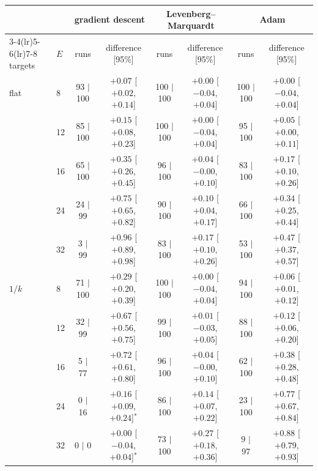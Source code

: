 \begin{tabular}{llcccccc}\toprule
 & & \multicolumn{2}{c}{gradient descent} & \multicolumn{2}{c}{Levenberg--Marquardt} & \multicolumn{2}{c}{Adam} \\\cmidrule(lr){3-4}\cmidrule(lr){5-6}\cmidrule(lr){7-8}
targets & $E$ & runs & difference [95\%] & runs & difference [95\%] & runs & difference [95\%] \\\midrule
flat & 8 & 93 $|$ 100 & $+0.07$ [$+0.02$, $+0.14$] & 100 $|$ 100 & $+0.00$ [$-0.04$, $+0.04$] & 100 $|$ 100 & $+0.00$ [$-0.04$, $+0.04$] \\
 & 12 & 85 $|$ 100 & $+0.15$ [$+0.08$, $+0.23$] & 100 $|$ 100 & $+0.00$ [$-0.04$, $+0.04$] & 95 $|$ 100 & $+0.05$ [$+0.00$, $+0.11$] \\
 & 16 & 65 $|$ 100 & $+0.35$ [$+0.26$, $+0.45$] & 96 $|$ 100 & $+0.04$ [$-0.00$, $+0.10$] & 83 $|$ 100 & $+0.17$ [$+0.10$, $+0.26$] \\
 & 24 & 24 $|$ 99 & $+0.75$ [$+0.65$, $+0.82$] & 90 $|$ 100 & $+0.10$ [$+0.04$, $+0.17$] & 66 $|$ 100 & $+0.34$ [$+0.25$, $+0.44$] \\
 & 32 & 3 $|$ 99 & $+0.96$ [$+0.89$, $+0.98$] & 83 $|$ 100 & $+0.17$ [$+0.10$, $+0.26$] & 53 $|$ 100 & $+0.47$ [$+0.37$, $+0.57$] \\
\midrule
$1/k$ & 8 & 71 $|$ 100 & $+0.29$ [$+0.20$, $+0.39$] & 100 $|$ 100 & $+0.00$ [$-0.04$, $+0.04$] & 94 $|$ 100 & $+0.06$ [$+0.01$, $+0.12$] \\
 & 12 & 32 $|$ 99 & $+0.67$ [$+0.56$, $+0.75$] & 99 $|$ 100 & $+0.01$ [$-0.03$, $+0.05$] & 88 $|$ 100 & $+0.12$ [$+0.06$, $+0.20$] \\
 & 16 & 5 $|$ 77 & $+0.72$ [$+0.61$, $+0.80$] & 96 $|$ 100 & $+0.04$ [$-0.00$, $+0.10$] & 62 $|$ 100 & $+0.38$ [$+0.28$, $+0.48$] \\
 & 24 & 0 $|$ 16 & $+0.16$ [$+0.09$, $+0.24$]$^\ast$ & 86 $|$ 100 & $+0.14$ [$+0.07$, $+0.22$] & 23 $|$ 100 & $+0.77$ [$+0.67$, $+0.84$] \\
 & 32 & 0 $|$ 0 & $+0.00$ [$-0.04$, $+0.04$]$^\ast$ & 73 $|$ 100 & $+0.27$ [$+0.18$, $+0.36$] & 9 $|$ 97 & $+0.88$ [$+0.79$, $+0.93$] \\
\bottomrule
\end{tabular}
